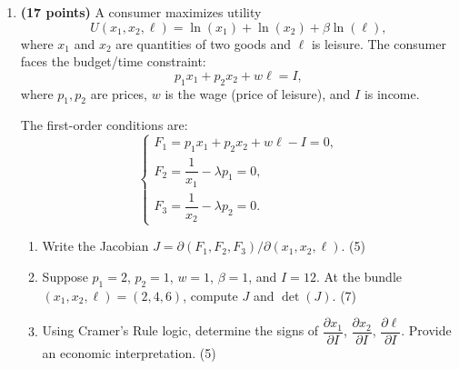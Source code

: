 \documentclass[12pt]{article}
\begin{document}
\begin{enumerate}
\begin{enumerate}[label=(\alph*)]
\item Compute the Jacobian matrix $J=\partial(x,y, z)/\partial(u,v,w)$. \hfill (5)
\item Evaluate $\det(J)$ at $(u,v,w)=(1,-2,3)$. Is the mapping locally invertible there? \hfill (5)
\end{enumerate}

\vspace{1cm}
\item\textbf{ (17 points)} A consumer maximizes utility
\[
U(x_1,x_2,\ell) = \ln(x_1) + \ln(x_2) + \beta \ln(\ell),
\]
where $x_1$ and $x_2$ are quantities of two goods and $\ell$ is leisure.  
The consumer faces the budget/time constraint:
\[
p_1 x_1 + p_2 x_2 + w\ell = I,
\]
where $p_1,p_2$ are prices, $w$ is the wage (price of leisure), and $I$ is income.

The first-order conditions are:
\[
\begin{cases}
F_1 = p_1 x_1 + p_2 x_2 + w\ell - I = 0, \\
F_2 = \dfrac{1}{x_1} - \lambda p_1 = 0, \\
F_3 = \dfrac{1}{x_2} - \lambda p_2 = 0.
\end{cases}
\]

\begin{enumerate}[label=(\alph*)]
\item Write the Jacobian $J=\partial(F_1,F_2,F_3)/\partial(x_1,x_2,\ell)$. \hfill (5)
\item Suppose $p_1=2$, $p_2=1$, $w=1$, $\beta=1$, and $I=12$. At the bundle $(x_1,x_2,\ell)=(2,4,6)$, compute $J$ and $\det(J)$. \hfill (7)
\item Using Cramer's Rule logic, determine the signs of $\dfrac{\partial x_1}{\partial I}$, $\dfrac{\partial x_2}{\partial I}$, $\dfrac{\partial \ell}{\partial I}$. Provide an economic interpretation. \hfill (5)
\end{enumerate}

\end{enumerate}
\end{document}
